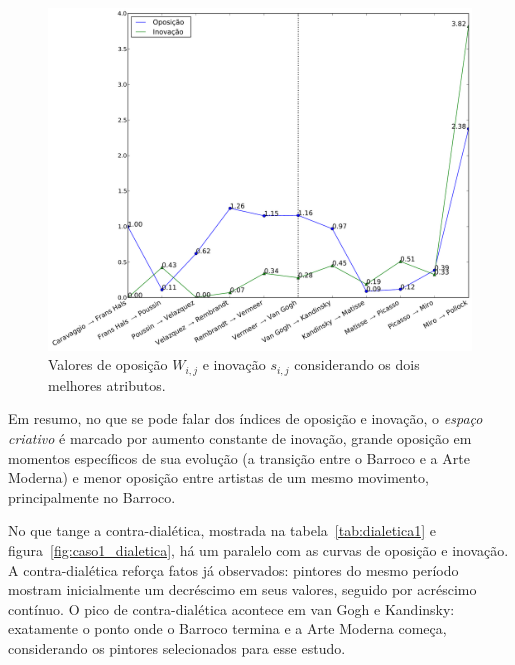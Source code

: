 \begin{figure}[h!]
\begin{center}
         \caption{Valores de oposição $W_{i,j}$ e inovação $s_{i,j}$ considerando
        os dois melhores atributos.}
        \label{fig:caso1_oposEinov}
        \includegraphics[width=\columnwidth]{figs/caso1_oposEinov}
        \fonteminha
\end{center}
\end{figure}

Em resumo, no que se pode falar dos índices de oposição e
inovação, o \textit{espaço criativo} é marcado por aumento constante
de inovação, grande oposição em momentos específicos de sua evolução
(a transição entre o Barroco e a Arte Moderna) e menor oposição entre
artistas de um mesmo movimento, principalmente no Barroco.

No que tange a contra-dialética, mostrada na
tabela~\ref{tab:dialetica1} e figura~\ref{fig:caso1_dialetica}, há um
paralelo com as curvas de oposição e inovação. A contra-dialética
reforça fatos já observados: pintores do mesmo período mostram
inicialmente um decréscimo em seus valores, seguido por acréscimo
contínuo. O pico de contra-dialética acontece em van Gogh e Kandinsky:
exatamente o ponto onde o Barroco termina e a Arte Moderna
começa, considerando os pintores selecionados para esse estudo.

